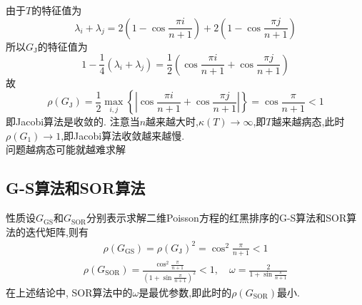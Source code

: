 \documentclass[12pt,a4paper]{article}
\begin{document}
由于$T$的特征值为
$$
\lambda_{i}+\lambda_{j}=2\left(1-\cos \frac{\pi i}{n+1}\right)+2\left(1-\cos \frac{\pi j}{n+1}\right)
$$
所以$G_{\mathrm{J}}$的特征值为
$$
1-\frac{1}{4}\left(\lambda_{i}+\lambda_{j}\right)=\frac{1}{2}\left(\cos \frac{\pi i}{n+1}+\cos \frac{\pi j}{n+1}\right)
$$
故
$$
\rho\left(G_{\mathrm{J}}\right)=\frac{1}{2} \max _{i, j}\left\{\left|\cos \frac{\pi i}{n+1}+\cos \frac{\pi j}{n+1}\right|\right\}=\cos \frac{\pi}{n+1}<1
$$
即Jacobi算法是收敛的.
注意当$n$越来越大时,$\kappa(T) \rightarrow \infty$,即$T$越来越病态,此时$\rho\left(G_{1}\right) \rightarrow 1$,即Jacobi算法收敛越来越慢.\\
{\color{blue}问题越病态可能就越难求解}\\
\subsection*{\color{blue}G-S算法和SOR算法}
{\color{blue}性质}设$G_{\mathrm{GS}}$和$G_{\mathrm{SOR}}$分别表示求解二维Poisson方程的红黑排序的G-S算法和SOR算法的迭代矩阵,则有
\begin{align*}
\rho\left(G_{\mathrm{GS}}\right)=\rho\left(G_{\mathrm{J}}\right)^{2}=\cos ^{2} \frac{\pi}{n+1}<1
\tag{6.13}
\end{align*}
\begin{align*}
\rho\left(G_{\mathrm{SOR}}\right)=\frac{\cos ^{2} \frac{\pi}{n+1}}{\left(1+\sin \frac{\pi}{n+1}\right)^{2}}<1, \quad \omega=\frac{2}{1+\sin \frac{\pi}{n+1}}
\tag{6.14}
\end{align*}
在上述结论中, SOR算法中的$\omega$是最优参数,即此时的$\rho\left(G_{\mathrm{SOR}}\right)$最小.
\end{document}
